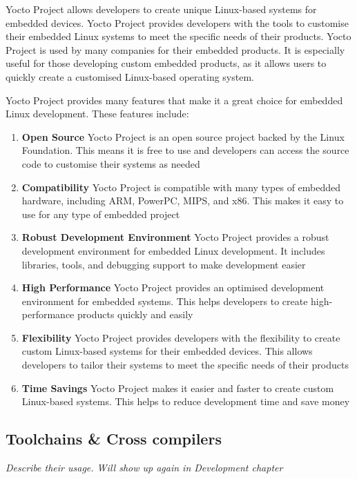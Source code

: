 Yocto Project allows developers to create unique Linux-based systems for embedded devices. Yocto Project provides developers with the tools to customise their embedded Linux systems to meet the specific needs of their products. Yocto Project is used by many companies for their embedded products. It is especially useful for those developing custom embedded products, as it allows users to quickly create a customised Linux-based operating system.

Yocto Project provides many features that make it a great choice for embedded Linux development. These features include:

\begin{enumerate}
	\item \textbf{Open Source} Yocto Project is an open source project backed by the Linux Foundation. This means it is free to use and developers can access the source code to customise their systems as needed
	\item \textbf{Compatibility} Yocto Project is compatible with many types of embedded hardware, including ARM, PowerPC, MIPS, and x86. This makes it easy to use for any type of embedded project
	\item \textbf{Robust Development Environment} Yocto Project provides a robust development environment for embedded Linux development. It includes libraries, tools, and debugging support to make development easier
	\item \textbf{High Performance} Yocto Project provides an optimised development environment for embedded systems. This helps developers to create high-performance products quickly and easily
	\item \textbf{Flexibility} Yocto Project provides developers with the flexibility to create custom Linux-based systems for their embedded devices. This allows developers to tailor their systems to meet the specific needs of their products
	\item \textbf{Time Savings} Yocto Project makes it easier and faster to create custom Linux-based systems. This helps to reduce development time and save money
\end{enumerate}

\subsection[SDKs \& Compiler Toolchains]{Toolchains \& Cross compilers}
\textit{Describe their usage. Will show up again in Development chapter}

